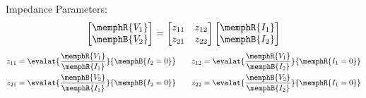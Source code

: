 \begin{multicols}{2}
\begin{CheatsheetEntryFrameStart}
        Impedance Parameters:
        \begin{equation*}
            \begin{bmatrix}
                \memphR{V_1} \\
                \memphB{V_2}
            \end{bmatrix}
            =
            \begin{bmatrix}
                z_{11} & z_{12} \\
                z_{21} & z_{22}
            \end{bmatrix}
            \begin{bmatrix}
                \memphR{I_1} \\
                \memphB{I_2}
            \end{bmatrix}
        \end{equation*}
        \begin{align*}
            z_{11} &= \evalat{\frac{\memphR{V_1}}{\memphR{I_1}}}{\memphB{I_2 = 0}} \quad &
            z_{12} &= \evalat{\frac{\memphR{V_1}}{\memphB{I_2}}}{\memphR{I_1 = 0}} \\
            z_{21} &= \evalat{\frac{\memphB{V_2}}{\memphR{I_1}}}{\memphB{I_2 = 0}} \quad &
            z_{22} &= \evalat{\frac{\memphB{V_2}}{\memphB{I_2}}}{\memphR{I_1 = 0}}
        \end{align*}


\end{CheatsheetEntryFrameStart}
\end{multicols}

